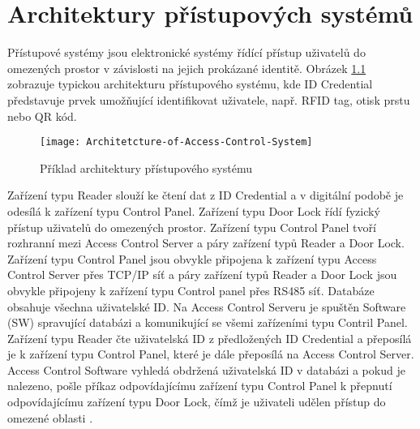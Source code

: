 \chapter{Architektury přístupových systémů}

Přístupové systémy jsou elektronické systémy řídící přístup uživatelů do omezených prostor v závislosti na jejich prokázané identitě.
Obrázek \ref{fig:Access control system architecture} zobrazuje typickou architekturu přístupového systému, kde ID Credential představuje prvek umožňující identifikovat uživatele, např. RFID tag, otisk prstu nebo QR kód. 

 
\begin{figure}[!h]
    \centering
    \texttt{[image: Architetcture-of-Access-Control-System]}
    \caption{Příklad architektury přístupového systému \cite{accessControlSystem_eiprocus}}
    \label{fig:Access control system architecture}
\end{figure}

Zařízení typu Reader slouží ke čtení dat z ID Credential a v digitální podobě je odesílá k zařízení typu Control Panel.
Zařízení typu Door Lock řídí fyzický přístup uživatelů do omezených prostor. 
Zařízení typu Control Panel tvoří rozhranní mezi Access Control Server a páry zařízení typů Reader a Door Lock. 
Zařízení typu Control Panel jsou obvykle připojena 
k zařízení typu Access Control Server přes TCP/IP síť a páry zařízení typů Reader a Door Lock jsou obvykle připojeny k zařízení typu Control panel přes RS485 síť. Databáze obsahuje všechna uživatelské ID.
Na Access Control Serveru je spuštěn Software (SW) spravující databázi a komunikující se všemi zařízeními typu Contril Panel.
Zařízení typu Reader čte uživatelská ID z předložených ID Credential a přeposílá je k zařízení typu Control Panel, které je dále přeposílá na Access Control Server. 
Access Control Software vyhledá obdržená uživatelská ID v databázi a pokud je nalezeno, pošle příkaz odpovídajícímu zařízení typu Control Panel k přepnutí odpovídajícímu zařízení typu Door Lock, čímž je uživateli udělen přístup do omezené oblasti \cite{accessControlSystem_eiprocus}.
